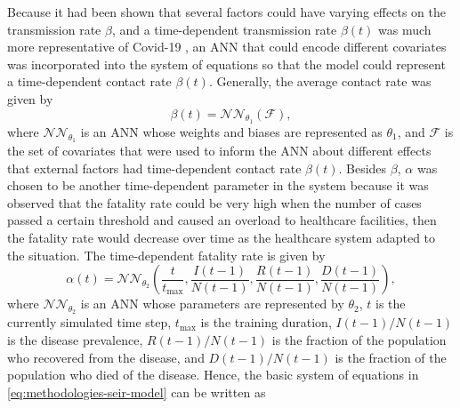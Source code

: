 Because it had been shown that several factors could have varying effects on the transmission rate $\beta$, and a time-dependent transmission rate $\beta(t)$ was much more representative of Covid-19 \cite{arikInterpretableSequenceLearning, changMobilityNetworkModels2021, dandekarMachineLearningAidedGlobal2020a, ihmecovid-19forecastingteamModelingCOVID19Scenarios2021, liSubstantialUndocumentedInfection2020}, an \gls{ANN} that could encode different covariates was incorporated into the system of equations so that the model could represent a time-dependent contact rate $\beta(t)$.
Generally, the average contact rate was given by
\begin{equation}
    \beta(t) = \mathcal{NN}_{\theta_1}(\mathcal{F}),
    \label{eq:methodologies-seir-time-dependent-contact-rate}
\end{equation}
where $\mathcal{NN}_{\theta_1}$ is an \gls{ANN} whose weights and biases are represented as $\theta_1$, and $\mathcal{F}$ is the set of covariates that were used to inform the \gls{ANN} about different effects that external factors had time-dependent contact rate $\beta(t)$.
Besides $\beta$, $\alpha$ was chosen to be another time-dependent parameter in the system because it was observed that the fatality rate could be very high when the number of cases passed a certain threshold and caused an overload to healthcare facilities, then the fatality rate would decrease over time as the healthcare system adapted to the situation.
The time-dependent fatality rate is given by
\begin{equation}
    \alpha(t) = \mathcal{NN}_{\theta_2} (\frac{t}{t_\text{max}}, \frac{I(t-1)}{N(t-1)}, \frac{R(t-1)}{N(t-1)}, \frac{D(t-1)}{N(t-1)}),
\end{equation}
where $\mathcal{NN}_{\theta_2}$ is an \gls{ANN} whose parameters are represented by $\theta_2$, $t$ is the currently simulated time step, $t_\text{max}$ is the training duration, $I(t-1)/N(t-1)$ is the disease prevalence, $R(t-1)/N(t-1)$ is the fraction of the population who recovered from the disease, and $D(t-1)/N(t-1)$ is the fraction of the population who died of the disease.
Hence, the basic system of equations in \autoref{eq:methodologies-seir-model} can be written as

